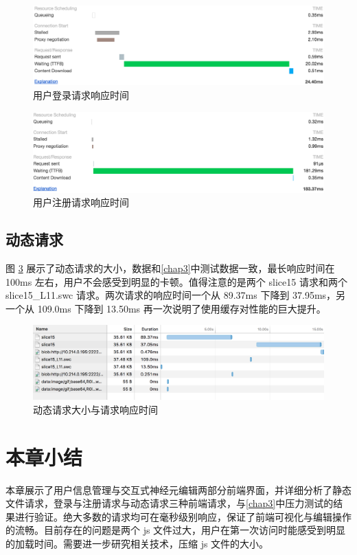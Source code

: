 \begin{figure}[!ht]
\centering
\includegraphics[width=128mm]{images/login-res}
\caption{用户登录请求响应时间}
\label{login-res}
\end{figure}

\begin{figure}[!ht]
\centering
\includegraphics[width=128mm]{images/signup-res}
\caption{用户注册请求响应时间}
\label{signup-res}
\end{figure}

\subsection{动态请求}
图 \ref{dy-res} 展示了动态请求的大小，数据和\ref{chap3}中测试数据一致，最长响应时间在 100ms 左右，用户不会感受到明显的卡顿。值得注意的是两个 slice15 请求和两个 slice15\_L11.swc 请求。两次请求的响应时间一个从 89.37ms 下降到 37.95ms，另一个从 109.0ms 下降到 13.50ms 再一次说明了使用缓存对性能的巨大提升。

\begin{figure}[!ht]
\centering
\includegraphics[width=128mm]{images/dy-res}
\caption{动态请求大小与请求响应时间}
\label{dy-res}
\end{figure}

\section{本章小结}
本章展示了用户信息管理与交互式神经元编辑两部分前端界面，并详细分析了静态文件请求，登录与注册请求与动态请求三种前端请求，与\ref{chap3}中压力测试的结果进行验证。绝大多数的请求均可在毫秒级别响应，保证了前端可视化与编辑操作的流畅。目前存在的问题是两个 js 文件过大，用户在第一次访问时能感受到明显的加载时间。需要进一步研究相关技术，压缩 js 文件的大小。